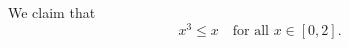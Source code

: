 \documentclass{article}
\begin{document}
We claim that
\[
x^3 \le x \quad \text{for all } x \in [0, 2].
\]
\end{document}
